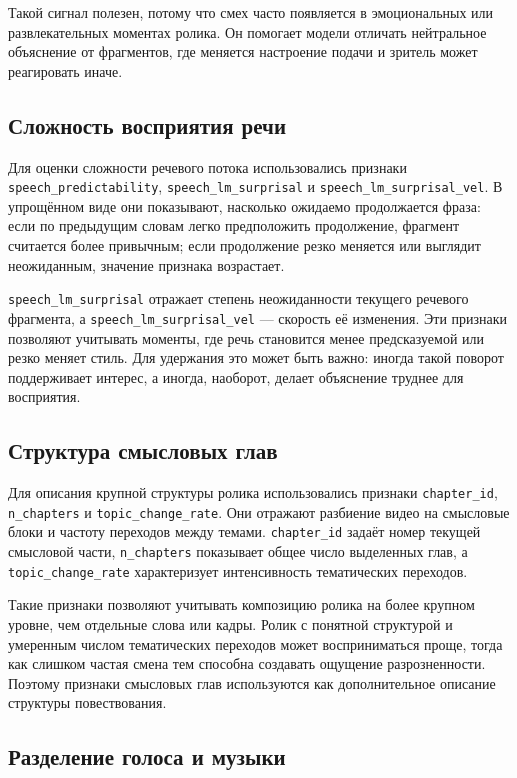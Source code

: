 \documentclass[times]{itmo-student-thesis}
\begin{document}
Такой сигнал полезен, потому что смех часто появляется в эмоциональных или развлекательных моментах ролика. Он помогает модели отличать нейтральное объяснение от фрагментов, где меняется настроение подачи и зритель может реагировать иначе.

\subsection{Сложность восприятия речи}

Для оценки сложности речевого потока использовались признаки \texttt{speech\_predictability}, \texttt{speech\_lm\_surprisal} и \texttt{speech\_lm\_surprisal\_vel}. В упрощённом виде они показывают, насколько ожидаемо продолжается фраза: если по предыдущим словам легко предположить продолжение, фрагмент считается более привычным; если продолжение резко меняется или выглядит неожиданным, значение признака возрастает.

\texttt{speech\_lm\_surprisal} отражает степень неожиданности текущего речевого фрагмента, а \texttt{speech\_lm\_surprisal\_vel} — скорость её изменения. Эти признаки позволяют учитывать моменты, где речь становится менее предсказуемой или резко меняет стиль. Для удержания это может быть важно: иногда такой поворот поддерживает интерес, а иногда, наоборот, делает объяснение труднее для восприятия.

\subsection{Структура смысловых глав}

Для описания крупной структуры ролика использовались признаки \texttt{chapter\_id}, \texttt{n\_chapters} и \texttt{topic\_change\_rate}. Они отражают разбиение видео на смысловые блоки и частоту переходов между темами. \texttt{chapter\_id} задаёт номер текущей смысловой части, \texttt{n\_chapters} показывает общее число выделенных глав, а \texttt{topic\_change\_rate} характеризует интенсивность тематических переходов.

Такие признаки позволяют учитывать композицию ролика на более крупном уровне, чем отдельные слова или кадры. Ролик с понятной структурой и умеренным числом тематических переходов может восприниматься проще, тогда как слишком частая смена тем способна создавать ощущение разрозненности. Поэтому признаки смысловых глав используются как дополнительное описание структуры повествования.

\subsection{Разделение голоса и музыки}
\end{document}
